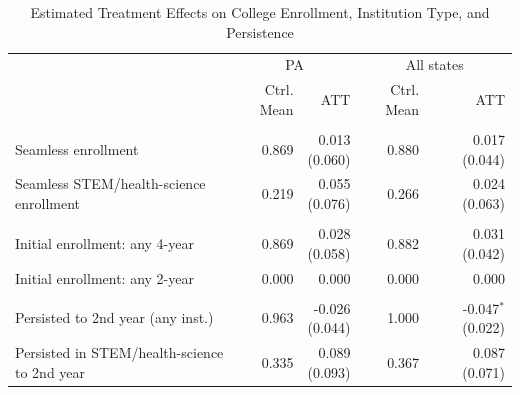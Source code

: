 \begin{table}[!h]
\centering
\caption{\label{tab:impact}Estimated Treatment Effects on College Enrollment, Institution Type, and Persistence}
\centering
\fontsize{10}{12}\selectfont
\begin{threeparttable}
\begin{tabular}[t]{lrrrr}
\toprule
\multicolumn{1}{c}{ } & \multicolumn{2}{c}{PA} & \multicolumn{2}{c}{All states} \\
\cmidrule(l{3pt}r{3pt}){2-3} \cmidrule(l{3pt}r{3pt}){4-5}
 & Ctrl. Mean & ATT & Ctrl. Mean & ATT\\
\midrule
\addlinespace[0.3em]
\hline
\multicolumn{5}{l}{(A) Enrollment}\\
\hspace{1em}Seamless enrollment & 0.869 & \makecell[r]{0.013\\(0.060)} & 0.880 & \makecell[r]{0.017\\(0.044)}\\
\hspace{1em}Seamless STEM/health-science enrollment & 0.219 & \makecell[r]{0.055\\(0.076)} & 0.266 & \makecell[r]{0.024\\(0.063)}\\
\addlinespace[0.3em]
\hline
\multicolumn{5}{l}{(B) Initial institution type}\\
\hspace{1em}Initial enrollment: any 4-year & 0.869 & \makecell[r]{0.028\\(0.058)} & 0.882 & \makecell[r]{0.031\\(0.042)}\\
\hspace{1em}Initial enrollment: any 2-year & 0.000 & \makecell[r]{0.000\\} & 0.000 & \makecell[r]{0.000\\}\\
\addlinespace[0.3em]
\hline
\multicolumn{5}{l}{(C) Persistence}\\
\hspace{1em}Persisted to 2nd year (any inst.) & 0.963 & \makecell[r]{-0.026\\(0.044)} & 1.000 & \makecell[r]{-0.047$^{*}$\\(0.022)}\\
\hspace{1em}Persisted in STEM/health-science to 2nd year & 0.335 & \makecell[r]{0.089\\(0.093)} & 0.367 & \makecell[r]{0.087\\(0.071)}\\

\end{tabular}
\end{threeparttable}
\end{table}
